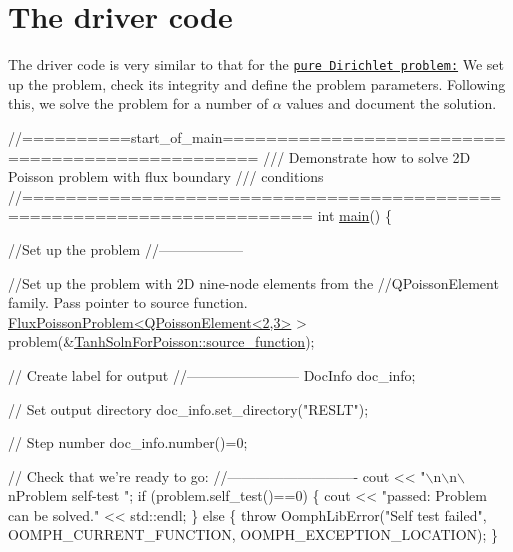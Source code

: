  

\hypertarget{index_main}{}\section{The driver code}\label{index_main}
The driver code is very similar to that for the \href{../../../poisson/two_d_poisson/html/index.html}{\tt pure Dirichlet problem\+:} We set up the problem, check its integrity and define the problem parameters. Following this, we solve the problem for a number of $ \alpha $ values and document the solution.

 
\begin{DoxyCodeInclude}
\textcolor{comment}{//==========start\_of\_main=================================================}
\textcolor{comment}{/// Demonstrate how to solve 2D Poisson problem with flux boundary }
\textcolor{comment}{}\textcolor{comment}{/// conditions}
\textcolor{comment}{}\textcolor{comment}{//========================================================================}
\textcolor{keywordtype}{int} \hyperlink{two__d__poisson__flux__bc_8cc_ae66f6b31b5ad750f1fe042a706a4e3d4}{main}()
\{

 \textcolor{comment}{//Set up the problem}
 \textcolor{comment}{//------------------}

 \textcolor{comment}{//Set up the problem with 2D nine-node elements from the}
 \textcolor{comment}{//QPoissonElement family. Pass pointer to source function. }
 \hyperlink{classFluxPoissonProblem}{FluxPoissonProblem<QPoissonElement<2,3>} > 
  problem(&\hyperlink{namespaceTanhSolnForPoisson_a967bc28320e02534beb714846b63e251}{TanhSolnForPoisson::source\_function});
 

 \textcolor{comment}{// Create label for output}
 \textcolor{comment}{//------------------------}
 DocInfo doc\_info;

 \textcolor{comment}{// Set output directory}
 doc\_info.set\_directory(\textcolor{stringliteral}{"RESLT"});

 \textcolor{comment}{// Step number}
 doc\_info.number()=0;



 \textcolor{comment}{// Check that we're ready to go:}
 \textcolor{comment}{//----------------------------}
 cout << \textcolor{stringliteral}{"\(\backslash\)n\(\backslash\)n\(\backslash\)nProblem self-test "};
 \textcolor{keywordflow}{if} (problem.self\_test()==0) 
  \{
   cout << \textcolor{stringliteral}{"passed: Problem can be solved."} << std::endl;
  \}
 \textcolor{keywordflow}{else} 
  \{
   \textcolor{keywordflow}{throw} OomphLibError(\textcolor{stringliteral}{"Self test failed"},
                       OOMPH\_CURRENT\_FUNCTION,
                       OOMPH\_EXCEPTION\_LOCATION);
  \}


\end{DoxyCodeInclude}
